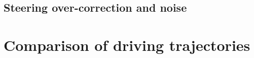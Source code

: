  



















\subsection{Steering over-correction and noise}







\section{Comparison of driving trajectories}




